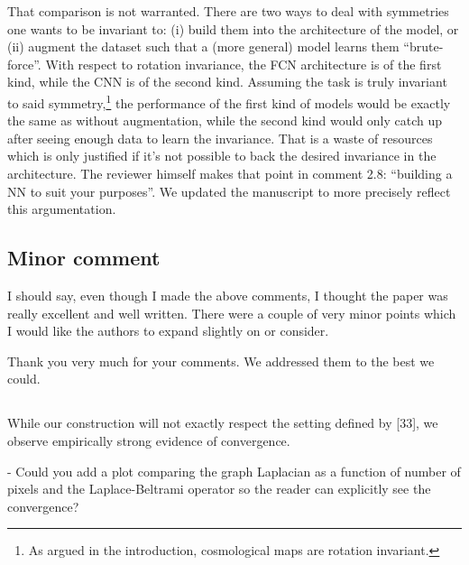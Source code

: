 \documentclass[12pt,a4paper]{article}
\newcommand{\nati}[1]{{\color[rgb]{.1,.6,.1}{NP: #1}}}
\newcommand{\mdeff}[1]{{\color[rgb]{.1,.6,.1}{MD: #1}}}
\newcommand{\TK}[1]{{\color{red}{TK: #1}}}
\newcommand{\1}{\b{1}}              %
\newcommand{\0}{\b{0}}              %
\begin{document}
That comparison is not warranted.
There are two ways to deal with symmetries one wants to be invariant to: (i) build them into the architecture of the model, or (ii) augment the dataset such that a (more general) model learns them ``brute-force''.
With respect to rotation invariance, the FCN architecture is of the first kind, while the CNN is of the second kind.
Assuming the task is truly invariant to said symmetry,\footnote{As argued in the introduction, cosmological maps are rotation invariant.} the performance of the first kind of models would be exactly the same as without augmentation, while the second kind would only catch up after seeing enough data to learn the invariance.
That is a waste of resources which is only justified if it's not possible to back the desired invariance in the architecture.
The reviewer himself makes that point in comment 2.8: ``building a NN to suit your purposes''.
We updated the manuscript to more precisely reflect this argumentation.
\TK{Seems a bit strong to me.. maybe we would write it in a softer language?}


\subsection*{Minor comment}

\begin{mdframed}[style=comment]
I should say, even though I made the above comments, I thought the paper was really excellent and well written. There were a couple of very minor points which I would like the authors to expand slightly on or consider.
\end{mdframed}
Thank you very much for your comments. We addressed them to the best we could.

\subsection{}
\begin{mdframed}[style=comment]
While our construction will not exactly respect the setting defined by [33], we observe empirically strong evidence of convergence.

- Could you add a plot comparing the graph Laplacian as a function of number of pixels and the Laplace-Beltrami operator so the reader can explicitly see the convergence?
\end{mdframed}
\end{document}
